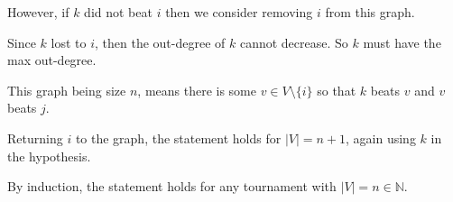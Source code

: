 \begin{soln}
\begin{itemize}
		      However, if \(k\) did not beat \(i\) then we consider removing \(i\) from this graph.

		      Since \(k\) lost to \(i\), then the out-degree of \(k\) cannot decrease. So \(k\) must have the max out-degree.

		      This graph being size \(n\), means there is some \(v \in V \setminus \{i\}\) so that \(k\) beats \(v\) and \(v\) beats \(j\).

		      Returning \(i\) to the graph, the statement holds for \(|V| = n + 1\), again using \(k\) in the hypothesis.
	\end{itemize}

	By induction, the statement holds for any tournament with \(|V| = n \in \mathbb{N}\).

\end{soln}
